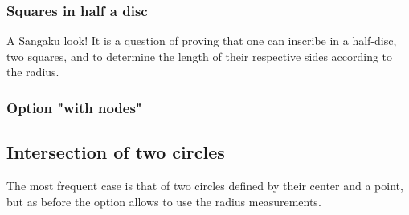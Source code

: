 \subsubsection{Squares in half a disc}
A Sangaku look! It is a question of proving that one can inscribe in a half-disc, two squares, and to determine the length of their respective sides according to the radius.

\begin{tkzexample}[latex=6cm,small]
\end{tkzexample}

\subsubsection{Option "with nodes"}
\begin{tkzexample}[latex=8cm,small]
\end{tkzexample}

\subsection{Intersection of two circles}

The most frequent case is that of two circles defined by their center and a point, but as before the option  allows to use the radius measurements.

